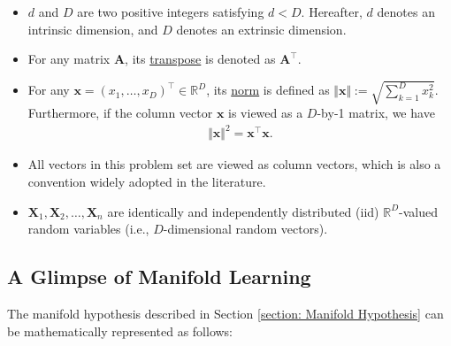 \documentclass[11pt,letterpaper, leqno]{article}
\numberwithin{equation}{section}
\numberwithin{theorem}{section}
\numberwithin{lemma}{section}
\numberwithin{corollary}{section}
\numberwithin{definition}{section}
\numberwithin{proposition}{section}
\numberwithin{remark}{section}
\numberwithin{example}{section}
\newcommand{\T}{\intercal}
\begin{document}
\begin{itemize}
    \item $d$ and $D$ are two positive integers satisfying $d<D$. Hereafter, $d$ denotes an intrinsic dimension, and $D$ denotes an extrinsic dimension.

\item For any matrix $\boldsymbol{A}$, its \href{https://en.wikipedia.org/wiki/Transpose}{transpose} is denoted as $\boldsymbol{A}^\T$.

    \item For any $\boldsymbol{x}=(x_1,\ldots,x_D)^\T \in\mathbb{R}^D$, its \href{https://en.wikipedia.org/wiki/Norm_(mathematics)}{norm} is defined as $\Vert \boldsymbol{x}\Vert := \sqrt{\sum_{k=1}^D x_k^2}$. Furthermore, if the column vector $\boldsymbol{x}$ is viewed as a $D$-by-1 matrix, we have 
    \begin{align}\label{eq: norm and inner product}
        \Vert \boldsymbol{x}\Vert^2= \boldsymbol{x}^\T \boldsymbol{x}.
    \end{align}

    \item All vectors in this problem set are viewed as column vectors, which is also a convention widely adopted in the literature.

    \item $\boldsymbol{X}_1, \boldsymbol{X}_2, \ldots, \boldsymbol{X}_n$ are identically and independently distributed (iid) $\mathbb{R}^D$-valued random variables (i.e., $D$-dimensional random vectors).
\end{itemize}

\subsection{A Glimpse of Manifold Learning}

The manifold hypothesis described in Section \ref{section: Manifold Hypothesis} can be mathematically represented as follows:
\end{document}
